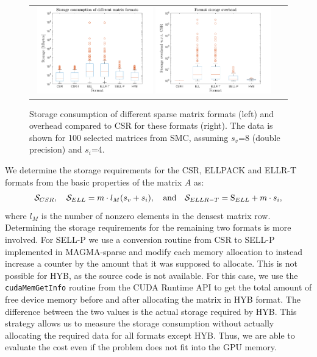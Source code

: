 \begin{figure}[t]
\begin{tabular}{cc}
    \includegraphics[width=0.48\textwidth]{plots/storage_consumption.pdf}
    \includegraphics[width=0.48\textwidth]{plots/storage_overhead.pdf} &
\end{tabular}
\vspace*{-2ex}
    \caption{Storage consumption 
    of different sparse matrix formats (left)
    and overhead compared to CSR for these formats (right).
    The data is shown for 100 selected matrices from SMC,
    assuming $s_v$=8 (double precision) and $s_i$=4.}
\label{2017-csr-spmv:fig:storage}
\end{figure}

We determine the storage requirements for the CSR, ELLPACK and ELLR-T formats
from the basic properties of the matrix $A$ as:
\[
    {\cal S}_{CSR}, \quad
    {\cal S}_{ELL}     = m \cdot l_{M}(s_v + s_i), \quad \mbox{\rm and} \quad
    {\cal S}_{ELLR-T}  = \text{S}_{ELL} + m \cdot s_i,
\]
where $l_{M}$ is the number of nonzero elements in the densest matrix row.
Determining the storage requirements for the remaining two formats
is more involved.
For SELL-P we use a conversion routine from CSR to SELL-P implemented in
MAGMA-sparse and modify each memory allocation
to instead increase a counter by the amount that it was supposed to allocate.
This is not possible for HYB, as the source code is not available.
For this case, we use the \texttt{cudaMemGetInfo} routine from the
CUDA Runtime API 
to get the total amount of free device memory
before and after allocating the matrix in HYB format.
The difference between the two values is the actual storage required by HYB.
This strategy allows us to measure the storage consumption
without actually allocating the required data for all formats except HYB.
Thus, we are able to evaluate the cost even if
the problem does not fit into the GPU memory.

